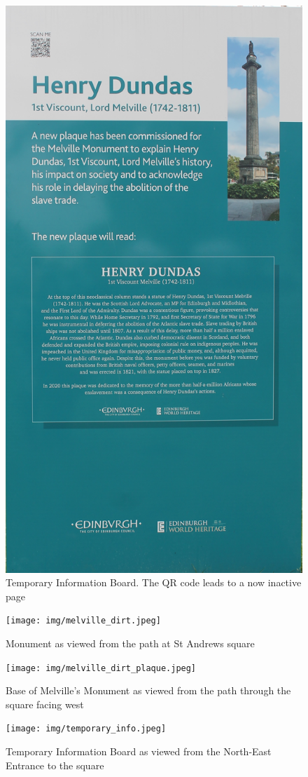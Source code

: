 \documentclass{scrartcl}
\begin{document}
\begin{appendices}
\begin{figure}
    \includegraphics[width=0.75\linewidth]{img/melville_temp.jpg}
    \caption{Temporary Information Board. The QR code leads to a now inactive page}
    \label{fig:temp_info}
\end{figure}
\begin{figure}
    \centering
    \texttt{[image: img/melville\_dirt.jpeg]}
    \caption{Monument as viewed from the path at St Andrews square}
    \label{fig:melville-dirt}
\end{figure}

\begin{figure}
    \centering
    \texttt{[image: img/melville\_dirt\_plaque.jpeg]}
    \caption{Base of Melville's Monument as viewed from the path through the square facing  west}
    \label{fig:melville-dirt-plaque}
\end{figure}

\begin{figure}
    \centering
    \texttt{[image: img/temporary\_info.jpeg]}
    \caption{Temporary Information Board as viewed from the North-East Entrance to the square}
    \label{fig:temp-info-square}
\end{figure}


\end{appendices}
\end{document}
